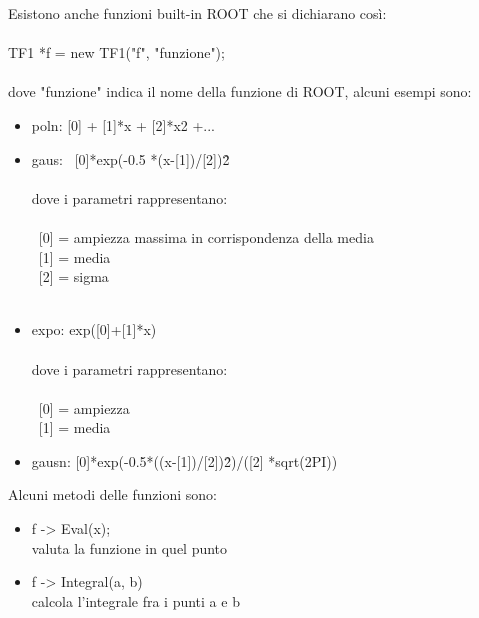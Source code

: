 \documentclass[10pt,a4paper]{article}
\begin{document}
Esistono anche funzioni built-in ROOT che si dichiarano così:\\\\
TF1 *f = new TF1("f", "funzione");\\\\
dove "funzione" indica il nome della funzione di ROOT, alcuni esempi sono: 
\begin{itemize}
	\item poln: [0] + [1]*x + [2]*x2 +...
	\item gaus: \ [0]*exp(-0.5 *(x-[1])/[2])\^2\\\\
	dove i parametri rappresentano:\\\\
	\ [0] = ampiezza massima in corrispondenza della media\\
	\ [1] = media\\
	\ [2] = sigma\\\\
	\item expo: exp([0]+[1]*x)\\\\
	dove i parametri rappresentano:\\\\
	\ [0] = ampiezza\\
	\ [1] = media\\
	\item gausn: [0]*exp(-0.5*((x-[1])/[2])\^2)/([2] *sqrt(2PI))
\end{itemize}
Alcuni metodi delle funzioni sono:
\begin{itemize}
	\item f -> Eval(x);\\
	valuta la funzione in quel punto
	\item f -> Integral(a, b)\\
	calcola l'integrale fra i punti a e b
	
\end{itemize}
\end{document}
